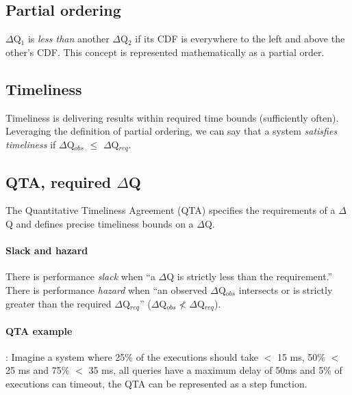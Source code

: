     \subsection{Partial ordering}
        $\Delta$Q$_1$ is \textit{less than} another $\Delta$Q$_2$ if its CDF is everywhere to the left and above the other's CDF. This concept is represented mathematically as a partial order. \cite{dq-tut} 

    \subsection{Timeliness}
        Timeliness is delivering results within required time bounds (sufficiently often). \cite{dq-tut}
        Leveraging the definition of partial ordering, we can say that a system \textit{satisfies timeliness} if $\Delta$Q$_{obs}$ $\le$ $\Delta$Q$_{req}$. \cite{art}
     
    \subsection{QTA, required $\Delta$Q}
        The Quantitative Timeliness Agreement (QTA) specifies the requirements of a $\Delta$Q and defines precise timeliness bounds on a $\Delta$Q. \cite{dq-br} \cite{art}
    
    \paragraph{Slack and hazard} There is performance \textit{slack} when ``a $\Delta$Q is strictly less than the requirement.'' \\
    There is performance \textit{hazard} when ``an observed $\Delta$Q$_{obs}$ intersects or is strictly greater than the required $\Delta$Q$_{req}$'' ($\Delta$Q$_{obs} \nless \Delta$Q$_{req}$). \cite{myo}
 
    \paragraph{QTA example}: Imagine a system where 25\% of the executions should take $<$ 15 ms, 50\% $<$ 25 ms and 75\% $<$ 35 ms, all queries have a maximum delay of 50ms and 5\% of executions can timeout, the QTA can be represented as a step function.
    
